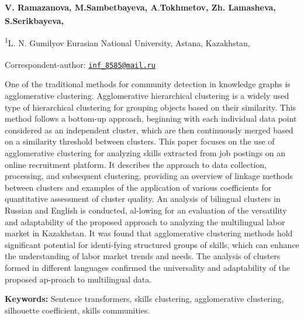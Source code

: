 
\begin{articleheader}

{\bfseries V. Ramazanova, M.Sambetbayeva, A}.{\bfseries Tokhmetov, Zh.
Lamasheva, S.Serikbayeva\textsuperscript{\envelope },}
\end{articleheader}

\begin{affiliation}
\textsuperscript{1}L. N. Gumilyov Eurasian National University, Astana,
Kazakhstan,

\raggedright {\bfseries \textsuperscript{\envelope }}Correspondent-author: \href{mailto:inf_8585@mail.ru}{\nolinkurl{inf\_8585@mail.ru}}
\end{affiliation}

One of the traditional methods for community detection in knowledge
graphs is agglomerative clustering. Agglomerative hierarchical
clustering is a widely used type of hierarchical clustering for grouping
objects based on their similarity. This method follows a bottom-up
approach, beginning with each individual data point considered as an
independent cluster, which are then continuously merged based on a
similarity threshold between clusters. This paper focuses on the use of
agglomerative clustering for analyzing skills extracted from job
postings on an online recruitment platform. It describes the approach to
data collection, processing, and subsequent clustering, providing an
overview of linkage methods between clusters and examples of the
application of various coefficients for quantitative assessment of
cluster quality. An analysis of bilingual clusters in Russian and
English is conducted, al-lowing for an evaluation of the versatility and
adaptability of the proposed approach to analyzing the multilingual
labor market in Kazakhstan. It was found that agglomerative clustering
methods hold significant potential for identi-fying structured groups of
skills, which can enhance the understanding of labor market trends and
needs. The analysis of clusters formed in different languages confirmed
the universality and adaptability of the proposed ap-proach to
multilingual data.

{\bfseries Keywords:} Sentence transformers, skills clustering,
agglomerative clustering, silhouette coefficient, skills communities.

